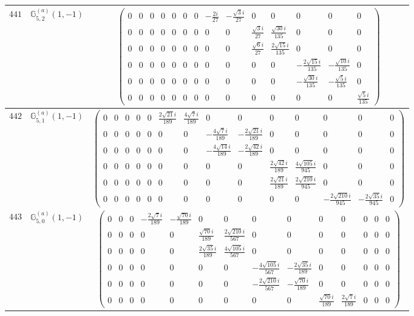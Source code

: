 \documentclass[fleqn,8pt,landscape]{jsarticle}
\begin{document}
\begin{center}
\begin{longtable}{ccc}
$ 441 $ & $ \mathbb{G}_{5,2}^{(a)}(1,-1) $ & $ \begin{pmatrix} 0 & 0 & 0 & 0 & 0 & 0 & 0 & - \frac{2 i}{27} & - \frac{\sqrt{3} i}{27} & 0 & 0 & 0 & 0 & 0 \\ 0 & 0 & 0 & 0 & 0 & 0 & 0 & 0 & 0 & \frac{\sqrt{3} i}{27} & \frac{\sqrt{30} i}{135} & 0 & 0 & 0 \\ 0 & 0 & 0 & 0 & 0 & 0 & 0 & 0 & 0 & \frac{\sqrt{6} i}{27} & \frac{2 \sqrt{15} i}{135} & 0 & 0 & 0 \\ 0 & 0 & 0 & 0 & 0 & 0 & 0 & 0 & 0 & 0 & 0 & - \frac{2 \sqrt{15} i}{135} & - \frac{\sqrt{10} i}{135} & 0 \\ 0 & 0 & 0 & 0 & 0 & 0 & 0 & 0 & 0 & 0 & 0 & - \frac{\sqrt{30} i}{135} & - \frac{\sqrt{5} i}{135} & 0 \\ 0 & 0 & 0 & 0 & 0 & 0 & 0 & 0 & 0 & 0 & 0 & 0 & 0 & \frac{\sqrt{5} i}{135} \end{pmatrix} $ \\ \hline
$ 442 $ & $ \mathbb{G}_{5,1}^{(a)}(1,-1) $ & $ \begin{pmatrix} 0 & 0 & 0 & 0 & 0 & \frac{2 \sqrt{21} i}{189} & \frac{4 \sqrt{7} i}{189} & 0 & 0 & 0 & 0 & 0 & 0 & 0 \\ 0 & 0 & 0 & 0 & 0 & 0 & 0 & - \frac{4 \sqrt{7} i}{189} & - \frac{2 \sqrt{21} i}{189} & 0 & 0 & 0 & 0 & 0 \\ 0 & 0 & 0 & 0 & 0 & 0 & 0 & - \frac{4 \sqrt{14} i}{189} & - \frac{2 \sqrt{42} i}{189} & 0 & 0 & 0 & 0 & 0 \\ 0 & 0 & 0 & 0 & 0 & 0 & 0 & 0 & 0 & \frac{2 \sqrt{42} i}{189} & \frac{4 \sqrt{105} i}{945} & 0 & 0 & 0 \\ 0 & 0 & 0 & 0 & 0 & 0 & 0 & 0 & 0 & \frac{2 \sqrt{21} i}{189} & \frac{2 \sqrt{210} i}{945} & 0 & 0 & 0 \\ 0 & 0 & 0 & 0 & 0 & 0 & 0 & 0 & 0 & 0 & 0 & - \frac{2 \sqrt{210} i}{945} & - \frac{2 \sqrt{35} i}{945} & 0 \end{pmatrix} $ \\ \hline
$ 443 $ & $ \mathbb{G}_{5,0}^{(a)}(1,-1) $ & $ \begin{pmatrix} 0 & 0 & 0 & - \frac{2 \sqrt{7} i}{189} & - \frac{\sqrt{70} i}{189} & 0 & 0 & 0 & 0 & 0 & 0 & 0 & 0 & 0 \\ 0 & 0 & 0 & 0 & 0 & \frac{\sqrt{70} i}{189} & \frac{2 \sqrt{210} i}{567} & 0 & 0 & 0 & 0 & 0 & 0 & 0 \\ 0 & 0 & 0 & 0 & 0 & \frac{2 \sqrt{35} i}{189} & \frac{4 \sqrt{105} i}{567} & 0 & 0 & 0 & 0 & 0 & 0 & 0 \\ 0 & 0 & 0 & 0 & 0 & 0 & 0 & - \frac{4 \sqrt{105} i}{567} & - \frac{2 \sqrt{35} i}{189} & 0 & 0 & 0 & 0 & 0 \\ 0 & 0 & 0 & 0 & 0 & 0 & 0 & - \frac{2 \sqrt{210} i}{567} & - \frac{\sqrt{70} i}{189} & 0 & 0 & 0 & 0 & 0 \\ 0 & 0 & 0 & 0 & 0 & 0 & 0 & 0 & 0 & \frac{\sqrt{70} i}{189} & \frac{2 \sqrt{7} i}{189} & 0 & 0 & 0 \end{pmatrix} $ \\ \hline

\end{longtable}
\end{center}
\end{document}
